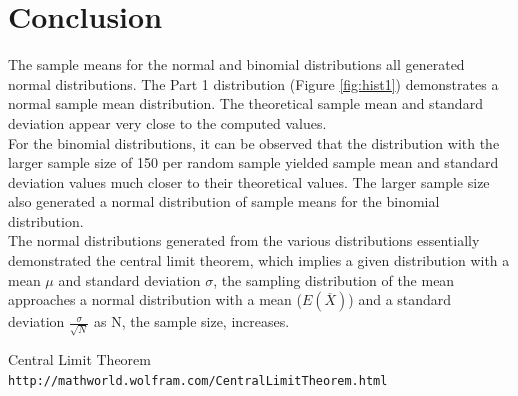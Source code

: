 \documentclass[paper=a4, fontsize=11pt]{article}
\begin{document}
    \section{Conclusion}
    The sample means for the normal and binomial distributions all generated normal distributions. The Part 1 distribution (Figure \ref{fig:hist1}) demonstrates a normal sample mean distribution. The theoretical sample mean and standard deviation appear very close to the computed values.\\


    For the binomial distributions, it can be observed that the distribution with the larger sample size of 150 per random sample yielded sample mean and standard deviation values much closer to their theoretical values. The larger sample size also generated a normal distribution of sample means for the binomial distribution.\\



    The normal distributions generated from the various distributions essentially demonstrated the central limit theorem, which implies a given distribution with a mean $\mu$ and standard deviation $\sigma$, the sampling distribution of the mean approaches a normal distribution with a mean ($E(\overline{X})$) and a standard deviation $\frac{\sigma}{\sqrt{N}}$ as N, the sample size, increases. \cite{wolfram}

    \begin{thebibliography}{9}

        Central Limit Theorem
        \\\texttt{http://mathworld.wolfram.com/CentralLimitTheorem.html}

    \end{thebibliography}

    \clearpage
    \newpage
\end{document}
